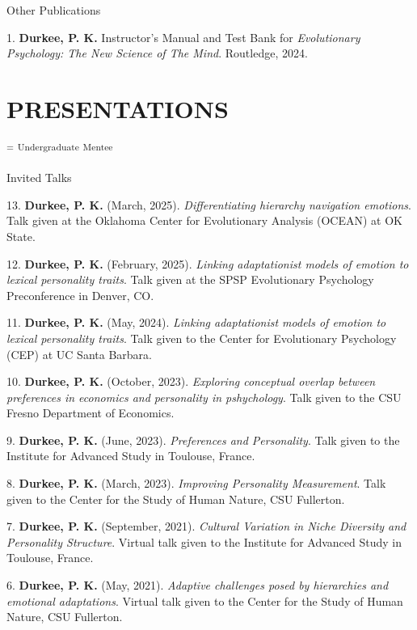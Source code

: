 \documentclass[10pt,]{article}
\begin{document}
\textcolor{light-gray}{Other Publications}

1. \hangindent=0.5in \textbf{Durkee, P. K.} Instructor's Manual and Test
Bank for \emph{Evolutionary Psychology: The New Science of The Mind}.
Routledge, 2024.

\section{PRESENTATIONS}\label{presentations}

\textsuperscript{\faChevronCircleDown} \textsuperscript{=}
\textsuperscript{Undergraduate} \textsuperscript{Mentee}

\textcolor{light-gray}{Invited Talks}

13. \hangindent=0.5in \textbf{Durkee, P. K.} (March, 2025).
\emph{Differentiating hierarchy navigation emotions}. Talk given at the
Oklahoma Center for Evolutionary Analysis (OCEAN) at OK State.

12. \hangindent=0.5in \textbf{Durkee, P. K.} (February, 2025).
\emph{Linking adaptationist models of emotion to lexical personality
traits}. Talk given at the SPSP Evolutionary Psychology Preconference in
Denver, CO.

11. \hangindent=0.5in \textbf{Durkee, P. K.} (May, 2024). \emph{Linking
adaptationist models of emotion to lexical personality traits}. Talk
given to the Center for Evolutionary Psychology (CEP) at UC Santa
Barbara.

10. \hangindent=0.5in \textbf{Durkee, P. K.} (October, 2023).
\emph{Exploring conceptual overlap between preferences in economics and
personality in pshychology}. Talk given to the CSU Fresno Department of
Economics.

9. \hangindent=0.5in \textbf{Durkee, P. K.} (June, 2023).
\emph{Preferences and Personality}. Talk given to the Institute for
Advanced Study in Toulouse, France.

8. \hangindent=0.5in \textbf{Durkee, P. K.} (March, 2023).
\emph{Improving Personality Measurement}. Talk given to the Center for
the Study of Human Nature, CSU Fullerton.

7. \hangindent=0.5in \textbf{Durkee, P. K.} (September, 2021).
\emph{Cultural Variation in Niche Diversity and Personality Structure}.
Virtual talk given to the Institute for Advanced Study in Toulouse,
France.

6. \hangindent=0.5in \textbf{Durkee, P. K.} (May, 2021). \emph{Adaptive
challenges posed by hierarchies and emotional adaptations}. Virtual talk
given to the Center for the Study of Human Nature, CSU Fullerton.
\end{document}
